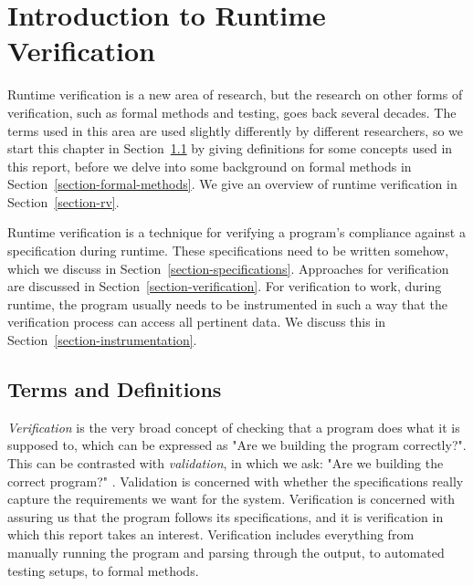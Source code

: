 
\pagestyle{newchap}
\chapter{Introduction to Runtime Verification} \label{chapter-intro-to-rv}

Runtime verification is a new area of research, but the research on other forms
of verification, such as formal methods and testing, goes back several decades.
The terms used in this area are used slightly differently by different
researchers, so we start this chapter in
Section~\ref{section-background-definitions} by giving definitions for some
concepts used in this report, before we delve into some background on formal
methods in Section~\ref{section-formal-methods}. We give an overview of runtime
verification in Section~\ref{section-rv}.

Runtime verification is a technique for verifying a program's compliance
against a specification during runtime. These specifications need to be written
somehow, which we discuss in Section~\ref{section-specifications}. Approaches
for verification are discussed in Section~\ref{section-verification}. For
verification to work, during runtime, the program usually needs to be
instrumented in such a way that the verification process can access all
pertinent data. We discuss this in Section~\ref{section-instrumentation}.


\section{Terms and Definitions}
\label{section-background-definitions}
\label{section-definition-verification}
\label{section-system-model}

\textit{Verification} is the very broad concept of checking that a program does
what it is supposed to, which can be expressed as "Are we building the program
correctly?". This can be contrasted with \textit{validation}, in which we ask:
"Are we building the correct program?" \cite{boehm81engineeringeconomics}.
Validation is concerned with whether the specifications really capture the
requirements we want for the system. Verification is concerned with assuring us
that the program follows its specifications, and it is verification in which
this report takes an interest. Verification includes everything from manually
running the program and parsing through the output, to automated testing
setups, to formal methods.

